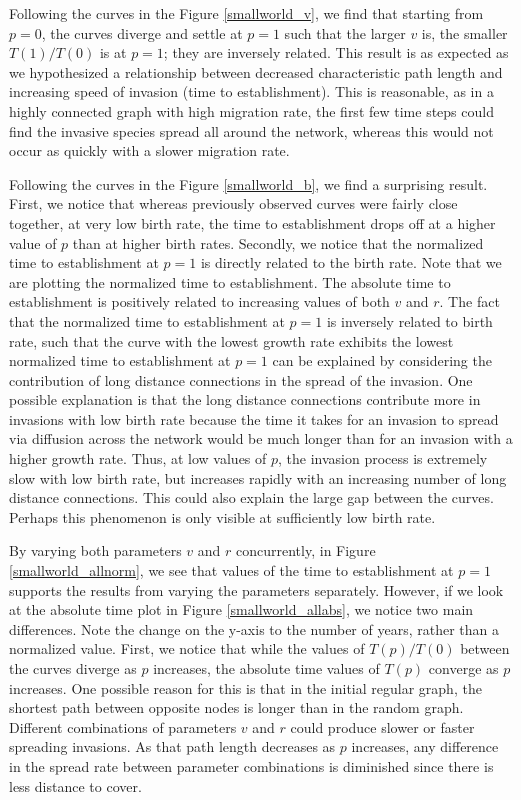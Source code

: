 \documentclass[12pt, openany]{book}
\theoremstyle{definition}
\theoremstyle{remark}
\numberwithin{equation}{chapter}
\numberwithin{figure}{chapter}
\begin{document}
Following the curves in the Figure \ref{smallworld_v}, we find that starting from $p = 0$, the curves diverge and settle at $p = 1$ such that the larger $v$ is, the smaller $T(1)/T(0)$ is at $p = 1$; they are inversely related. This result is as expected as we hypothesized a relationship between decreased characteristic path length and increasing speed of invasion (time to establishment). This is reasonable, as in a highly connected graph with high migration rate, the first few time steps could find the invasive species spread all around the network, whereas this would not occur as quickly with a slower migration rate.

Following the curves in the Figure \ref{smallworld_b}, we find a surprising result. First, we notice that whereas previously observed curves were fairly close together, at very low birth rate, the time to establishment drops off at a higher value of $p$ than at higher birth rates. Secondly, we notice that the normalized time to establishment at $p = 1$ is directly related to the birth rate. Note that we are plotting the normalized time to establishment. The absolute time to establishment is positively related to increasing values of both $v$ and $r$. The fact that the normalized time to establishment at $p = 1$ is inversely related to birth rate, such that the curve with the lowest growth rate exhibits the lowest normalized time to establishment at $p = 1$ can be explained by considering the contribution of long distance connections in the spread of the invasion. One possible explanation is that the long distance connections contribute more in invasions with low birth rate because the time it takes for an invasion to spread via diffusion across the network would be much longer than for an invasion with a higher growth rate. Thus, at low values of $p$, the invasion process is extremely slow with low birth rate, but increases rapidly with an increasing number of long distance connections. This could also explain the large gap between the curves. Perhaps this phenomenon is only visible at sufficiently low birth rate. 

By varying both parameters $v$ and $r$ concurrently, in Figure \ref{smallworld_allnorm}, we see that values of the time to establishment at $p = 1$ supports the results from varying the parameters separately. However, if we look at the absolute time plot in Figure \ref{smallworld_allabs}, we notice two main differences. Note the change on the y-axis to the number of years, rather than a normalized value. First, we notice that while the values of $T(p)/T(0)$ between the curves diverge as $p$ increases, the absolute time values of $T(p)$ converge as $p$ increases. One possible reason for this is that in the initial regular graph, the shortest path between opposite nodes is longer than in the random graph. Different combinations of parameters $v$ and $r$ could produce slower or faster spreading invasions. As that path length decreases as $p$ increases, any difference in the spread rate between parameter combinations is diminished since there is less distance to cover. 
\end{document}
